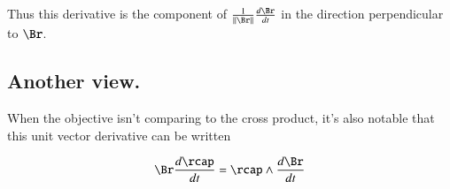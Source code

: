 Thus this derivative is the component of
$\frac{1}{{\Vert \Br \Vert}}\dt{\Br}$
in the direction perpendicular to 
$\Br$.

\subsection{Another view.}

When the objective isn't comparing to the cross product, it's also notable that this unit vector derivative can be written

\[
{{ \Br }} \dt{\rcap}
= \rcap \wedge \dt{\Br}
\]


%
%
%
%
%

